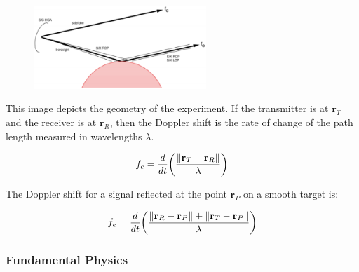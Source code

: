 \documentclass[oneside]{book}
\theoremstyle{mystyle}
\DeclarePairedDelimiter\norm{\lVert}{\rVert}
\begin{document}
\begin{figure}
	\begin{center}
	\includegraphics[width = 0.58\textwidth]{USER_12}
	\end{center}
\end{figure}
\noindent This image depicts the geometry of the experiment. If the transmitter is at $\mathbf{r}_{T}$ and the receiver is at $\mathbf{r}_{R}$, then the Doppler shift is the rate of change of the path length measured in wavelengths $\lambda$. 

\begin{equation}
f_{c} = \frac{d}{dt}\bigg(\frac{\norm{\mathbf{r}_{T}-\mathbf{r}_{R}}}{\lambda}\bigg)
\end{equation}

\noindent The Doppler shift for a signal reflected at the point $\mathbf{r}_{P}$ on a smooth target is:

\begin{equation}
f_{e} = \frac{d}{dt}\bigg(\frac{\norm{\mathbf{r}_{R} - \mathbf{r}_{P}}+\norm{\mathbf{r}_{T}-\mathbf{r}_{P}}}{\lambda}\bigg)
\end{equation}

\subsubsection{Fundamental Physics}
\end{document}
